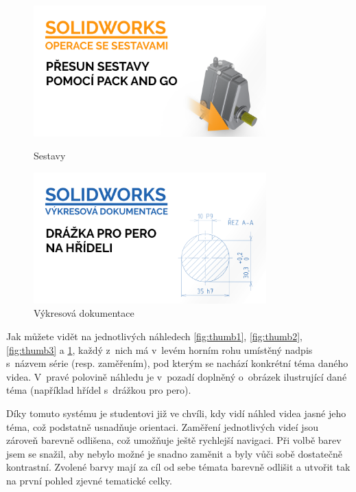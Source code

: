 \begin{figure}[htbp]
    \centering
    \begin{minipage}[b]{0.45\textwidth}
        \centering
        \includegraphics[width=0.8\textwidth]{img/020/pack-and-go-thumbnail.png}
        \caption{Sestavy}
        \label{fig:thumb3}
    \end{minipage}
    \qquad
    \begin{minipage}[b]{0.45\textwidth}
        \centering
        \includegraphics[width=0.8\textwidth]{img/020/dwg-perodr-hr-thumbnail.png}
        \caption{Výkresová dokumentace}
        \label{fig:thumb4}
    \end{minipage}
\end{figure}

Jak můžete vidět na jednotlivých náhledech \ref{fig:thumb1}, \ref{fig:thumb2}, \ref{fig:thumb3} a \ref{fig:thumb4}, každý z~nich má v~levém horním rohu umístěný nadpis s~názvem série (resp. zaměřením), pod kterým se nachází konkrétní téma daného videa.
V~pravé polovině náhledu je v~pozadí doplněný o~obrázek ilustrující dané téma (například hřídel s~drážkou pro pero).

Díky tomuto systému je studentovi již ve chvíli, kdy vidí náhled videa jasné jeho téma, což podstatně usnadňuje orientaci.
Zaměření jednotlivých videí jsou zároveň barevně odlišena, což umožňuje ještě rychlejší navigaci.
Při volbě barev jsem se snažil, aby nebylo možné je snadno zaměnit a byly vůči sobě dostatečně kontrastní.
Zvolené barvy mají za cíl od sebe témata barevně odlišit a utvořit tak na první pohled zjevné tematické celky.

